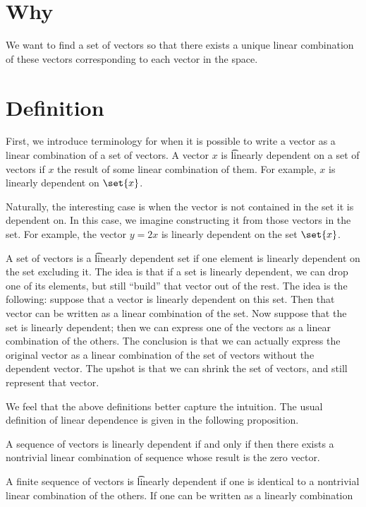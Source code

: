 
\section*{Why}

We want to find a set of vectors so that there exists a unique linear combination of these vectors corresponding to each vector in the space.

\section*{Definition}

First, we introduce terminology for when it is possible to write a vector as a linear combination of a set of vectors.
A vector $x$ is \t{linearly dependent on a set of vectors} if $x$ the result of some linear combination of them.
For example, $x$ is linearly dependent on $\set{x}$.


Naturally, the interesting case is when the vector is not contained in the set it is dependent on.
In this case, we imagine constructing it from those vectors in the set.
For example, the vector $y = 2x$ is linearly dependent on the set $\set{x}$.

A set of vectors is a \t{linearly dependent set} if one element is linearly dependent on the set excluding it.
The idea is that if a set is linearly dependent, we can drop one of its elements, but still ``build'' that vector out of the rest.
The idea is the following: suppose that a vector is linearly dependent on this set.
Then that vector can be written as a linear combination of the set.
Now suppose that the set is linearly dependent; then we can express one of the vectors as a linear combination of the others.
The conclusion is that we can actually express the original vector as a linear combination of the set of vectors without the dependent vector.
The upshot is that we can shrink the set of vectors, and still represent that vector.

We feel that the above definitions better capture the intuition.
The usual definition of linear dependence is given in the following proposition.
\begin{proposition}
A sequence of vectors is linearly dependent if and only if then there exists a nontrivial linear combination of sequence whose result is the zero vector.
\end{proposition}


A finite sequence of vectors is \t{linearly dependent} if one is identical to a nontrivial linear combination of the others.
If one can be written as a linearly combination

